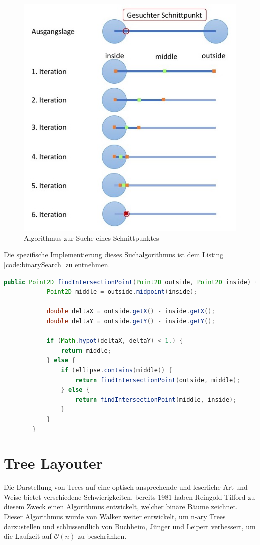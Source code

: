 \documentclass[11pt,a4paper,english,oneside]{book}
\numberwithin{equation}{chapter}
\begin{document}
	\begin{figure}
		\centering
		\includegraphics[width=0.6\linewidth]{assets/images/binarySearch}
		\caption{Algorithmus zur Suche eines Schnittpunktes}
		\label{fig:binarySearch}
	\end{figure}
	
	Die spezifische Implementierung dieses Suchalgorithmus ist dem Listing \ref{code:binarySearch} zu entnehmen.
	
	\begin{lstlisting}[language=java, frame=single,caption={Algorithmus Schnittpunkt Suche}, label={code:binarySearch}]
		public Point2D findIntersectionPoint(Point2D outside, Point2D inside) {
			Point2D middle = outside.midpoint(inside);
		
			double deltaX = outside.getX() - inside.getX();
			double deltaY = outside.getY() - inside.getY();
		
			if (Math.hypot(deltaX, deltaY) < 1.) {
				return middle;
			} else {
				if (ellipse.contains(middle)) {
					return findIntersectionPoint(outside, middle);
				} else {
					return findIntersectionPoint(middle, inside);
				}
			}
		}
	\end{lstlisting}


	\section{Tree Layouter} \label{ssec:treelayouter}

	Die Darstellung von Trees auf eine optisch ansprechende und leserliche Art und Weise bietet verschiedene Schwierigkeiten. bereits 1981 haben Reingold-Tilford \cite{reingold-tilford} zu diesem Zweck einen Algorithmus entwickelt, welcher binäre Bäume zeichnet. Dieser Algorithmus wurde von Walker weiter entwickelt, um n-ary Trees darzustellen und schlussendlich von Buchheim, Jünger und Leipert \cite{tree-algorithm} verbessert, um die Laufzeit auf $\mathcal{O}(n)$ zu beschränken. 
	
\end{document}
